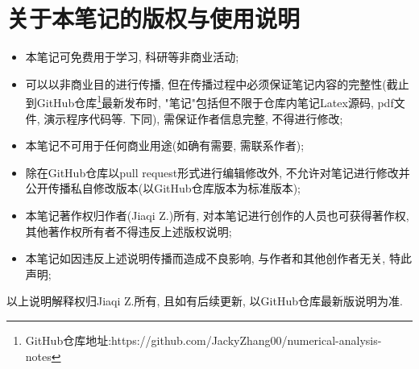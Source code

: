 \chapter{关于本笔记的版权与使用说明}

\begin{itemize}
    \item 本笔记可免费用于学习, 科研等非商业活动;
    \item 可以以非商业目的进行传播, 但在传播过程中必须保证笔记内容的完整性(截止到GitHub仓库\footnote{GitHub仓库地址:https://github.com/JackyZhang00/numerical-analysis-notes}最新发布时, "笔记"包括但不限于仓库内笔记Latex源码, pdf文件, 演示程序代码等. 下同), 需保证作者信息完整, 不得进行修改;
    \item 本笔记不可用于任何商业用途(如确有需要, 需联系作者);
    \item 除在GitHub仓库以pull request形式进行编辑修改外, 不允许对笔记进行修改并公开传播私自修改版本(以GitHub仓库版本为标准版本);
    \item 本笔记著作权归作者(Jiaqi Z.)所有, 对本笔记进行创作的人员也可获得著作权, 其他著作权所有者不得违反上述版权说明;
    \item 本笔记如因违反上述说明传播而造成不良影响, 与作者和其他创作者无关, 特此声明;
\end{itemize}

以上说明解释权归Jiaqi Z.所有, 且如有后续更新, 以GitHub仓库最新版说明为准.